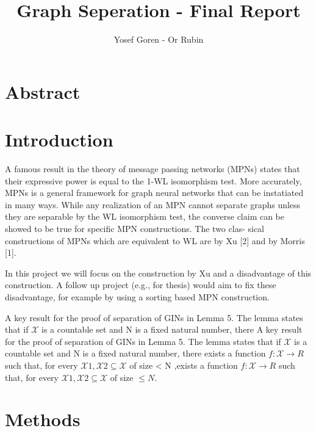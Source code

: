 \documentclass{article}
\begin{document}
\author{Yosef Goren - Or Rubin}
\title{Graph Seperation - Final Report}
\maketitle
\part*{Abstract}

\part*{Introduction}
A famous result in the theory of message passing networks (MPNs) states
that their expressive power is equal to the 1-WL isomorphism test.
More accurately, MPNs is a general framework for graph neural networks that can be
instatiated in many ways. While any realization of an MPN cannot separate
graphs unless they are separable by the WL isomorphism test, the converse
claim can be showed to be true for specific MPN constructions. The two clas-
sical constructions of MPNs which are equivalent to WL are by Xu [2] and by
Morris [1].

In this project we will focus on the construction by Xu and a disadvantage
of this construction. A follow up project (e.g., for thesis) would aim to fix these
disadvantage, for example by using a sorting based MPN construction.


A key result for the proof of separation of GINs in Lemma 5. The lemma
states that if $\mathcal{X}$ is a countable set and N is a fixed natural number, there
A key result for the proof of separation of GINs in Lemma 5. The lemma
states that if $\mathcal{X}$ is a countable set and N is a fixed natural number, there
exists a function $f : \mathcal{X} \rightarrow R$ such that, for every $\mathcal{X}1, \mathcal{X}2 \subseteq \mathcal{X}$
of size < N ,exists a function $f : \mathcal{X} \rightarrow R$ such that, for every
$\mathcal{X}1, \mathcal{X}2 \subseteq \mathcal{X}$ of size $\leq N$.



\part*{Methods}
\end{document}
